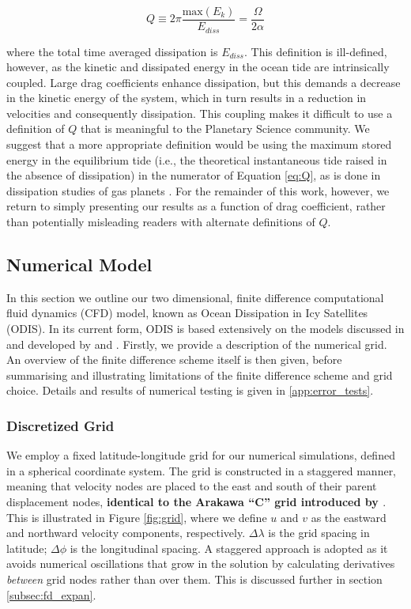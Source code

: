 \begin{equation}\label{eq:Q}
Q \equiv 2 \pi \dfrac{\text{max} \left( E_{k} \right)}{E_{diss}} = \dfrac{\Omega}{2 \alpha}
\end{equation}

where the total time averaged dissipation is $E_{diss}$. This definition is ill-defined, however, as the kinetic and dissipated energy in the ocean tide are intrinsically coupled. Large drag coefficients enhance dissipation, but this demands a decrease in the kinetic energy of the system, which in turn results in a reduction in velocities and consequently dissipation. This coupling makes it difficult to use a definition of $Q$ that is meaningful to the Planetary Science community. We suggest that a more appropriate definition would be using the maximum stored energy in the equilibrium tide (i.e., the theoretical instantaneous tide raised in the absence of dissipation) in the numerator of Equation \ref{eq:Q}, as is done in dissipation studies of gas planets \citep{goldreich1966q}. For the remainder of this work, however, we return to simply presenting our results as a function of drag coefficient, rather than potentially misleading readers with alternate definitions of $Q$. 

\subsection{Numerical Model \label{subsec:model}}

In this section we outline our two dimensional, finite difference computational fluid dynamics (CFD) model, known as Ocean Dissipation in Icy Satellites (ODIS). In its current form, ODIS is based extensively on the models discussed in and developed by \citet{zahel1973diurnalk,zahel1978influence} and \citet{sears1994tidal,sears1995tidal}. Firstly, we provide a description of the numerical grid. An overview of the finite difference scheme itself is then given, before summarising and illustrating limitations of the finite difference scheme and grid choice. Details and results of numerical testing is given in \ref{app:error_tests}.  

\subsubsection{Discretized Grid \label{subsec:grid}}

We employ a fixed latitude-longitude grid for our numerical simulations, defined in a spherical coordinate system. The grid is constructed in a staggered manner, meaning that velocity nodes are placed to the east and south of their parent displacement nodes, \textbf{identical to the Arakawa ``C'' grid introduced by \citet{arakawa1977computational}}. This is illustrated in Figure \ref{fig:grid}, where we define $u$ and $v$ as the eastward and northward velocity components, respectively. $\Delta \lambda$ is the grid spacing in latitude; $\Delta \phi$ is the longitudinal spacing. A staggered approach is adopted as it avoids numerical oscillations that grow in the solution by calculating derivatives \textit{between} grid nodes rather than over them. This is discussed further in section \ref{subsec:fd_expan}.

